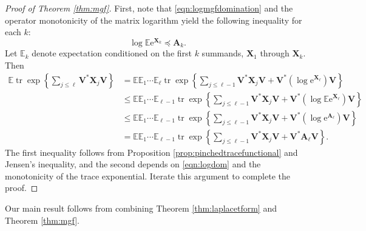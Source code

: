 \documentclass[11pt,letterpaper,twoside,reqno,nosumlimits]{amsart}
\renewcommand{\star}{*}
\newcommand{\mat}[1]{\ensuremath{\bm{#1}}} %
\newcommand{\e}{\ensuremath{\mathrm{e}}}
\newcommand{\E}{\ensuremath{\mathbb{E}}}
\DeclareMathOperator{\tr}{tr}
\newcommand{\trexp}[1]{\ensuremath{\tr\exp\left\{#1\right\}}}
\theoremstyle{remark}
\numberwithin{equation}{section}
\numberwithin{thm}{section}
\numberwithin{prop}{section}
\numberwithin{defn}{section}
\numberwithin{remark}{section}
\begin{document}
\begin{proof}[Proof of Theorem \ref{thm:mgf}]
 First, note that \eqref{eqn:logmgfdomination} and the operator monotonicity of the matrix logarithm yield the following inequality for each $k$: 
\begin{equation}
\log \E \e^{\mat{X}_k} \preceq \mat{A}_k.
\label{eqn:logdom}
\end{equation}
Let $\E_k$ denote expectation conditioned on the first $k$ summands, $\mat{X}_1$ through $\mat{X}_k.$ Then
\begin{align*}
 \E \trexp{\sum_{j \leq \ell} \mat{V}^\star \mat{X}_j \mat{V}} & = \E\E_1\cdots \E_\ell \trexp{\sum_{j \leq \ell-1} \mat{V}^\star \mat{X}_j \mat{V} + \mat{V}^\star \left( \log \e^{\mat{X}_\ell} \right) \mat{V}} \\
 & \leq \E\E_1\cdots \E_{\ell-1} \trexp{\sum_{j \leq \ell-1} \mat{V}^\star \mat{X}_j \mat{V} + \mat{V}^\star \left( \log\E\e^{\mat{X}_\ell} \right) \mat{V}} \\
 & \leq \E\E_1\cdots \E_{\ell-1} \trexp{\sum_{j \leq \ell-1} \mat{V}^\star \mat{X}_j \mat{V} + \mat{V}^\star \left( \log\e^{\mat{A}_\ell} \right) \mat{V} } \\
 & = \E\E_1\cdots \E_{\ell-1} \trexp{\sum_{j \leq \ell-1} \mat{V}^\star \mat{X}_j \mat{V} + \mat{V}^\star \mat{A}_\ell \mat{V} }.
\end{align*}
The first inequality follows from Proposition \ref{prop:pinchedtracefunctional} and Jensen's inequality, and the second depends on \eqref{eqn:logdom} and the monotonicity of the trace exponential. Iterate this argument to complete the proof.
\end{proof}


Our main result follows from combining Theorem \ref{thm:laplacetform} and Theorem \ref{thm:mgf}.
\end{document}
